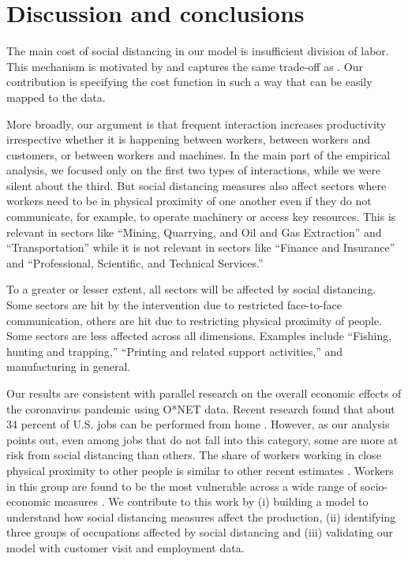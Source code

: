 \section*{Discussion and conclusions}

The main cost of social distancing in our model is insufficient division of labor. This mechanism is motivated by \cite{Smith1778-qq} and captures the same trade-off as \cite{Becker1992-ac}. Our contribution is specifying the cost function in such a way that can be easily mapped to the data.

More broadly, our argument is that frequent interaction increases productivity irrespective whether it is happening between workers, between workers and customers, or between workers and machines. In the main part of the empirical analysis, we focused only on the first two types of interactions, while we were silent about the third. But social distancing measures also affect sectors where workers need to be in physical proximity of one another even if they do not communicate, for example, to operate machinery or access key resources. This is relevant in sectors like ``Mining, Quarrying, and Oil and Gas Extraction'' and ``Transportation'' while it is not relevant in sectors like ``Finance and Insurance'' and ``Professional, Scientific, and Technical Services.'' 

To a greater or lesser extent, all sectors will be affected by social distancing. Some sectors are hit by the intervention due to restricted face-to-face communication, others are hit due to restricting physical proximity of people. Some sectors are less affected across all dimensions. Examples include ``Fishing, hunting and trapping,'' ``Printing and related support activities,'' and manufacturing in general. 

Our results are consistent with parallel research on the overall economic effects of the coronavirus pandemic using O*NET data. Recent research found that about 34 percent of U.S. jobs can be performed from home \cite{Dingel2020-lh}. However, as our analysis points out, even among jobs that do not fall into this category, some are more at risk from social distancing than others. The share of workers working in close physical proximity to other people is similar to other recent estimates \cite{Leibovici2020-qr}. Workers in this group are found to be the most vulnerable across a wide range of socio-economic measures \cite{Jin2020-tq,Mongey2020-qc}. We contribute to this work by (i) building a model to understand how social distancing measures affect the production, (ii) identifying three groups of occupations affected by social distancing and (iii) validating our model with customer visit and employment data.

